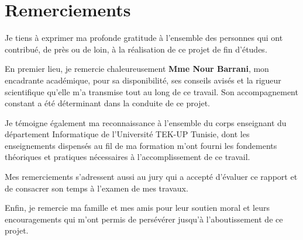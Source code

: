 \chapter*{\huge Remerciements}

Je tiens à exprimer ma profonde gratitude à l'ensemble des personnes qui ont contribué, de près ou de loin, à la réalisation de ce projet de fin d'études.

En premier lieu, je remercie chaleureusement \textbf{Mme Nour Barrani}, mon encadrante académique, pour sa disponibilité, ses conseils avisés et la rigueur scientifique qu'elle m'a transmise tout au long de ce travail. Son accompagnement constant a été déterminant dans la conduite de ce projet.

Je témoigne également ma reconnaissance à l'ensemble du corps enseignant du département Informatique de l'Université TEK-UP Tunisie, dont les enseignements dispensés au fil de ma formation m'ont fourni les fondements théoriques et pratiques nécessaires à l'accomplissement de ce travail.

Mes remerciements s'adressent aussi au jury qui a accepté d'évaluer ce rapport et de consacrer son temps à l'examen de mes travaux.

Enfin, je remercie ma famille et mes amis pour leur soutien moral et leurs encouragements qui m'ont permis de persévérer jusqu'à l'aboutissement de ce projet.
